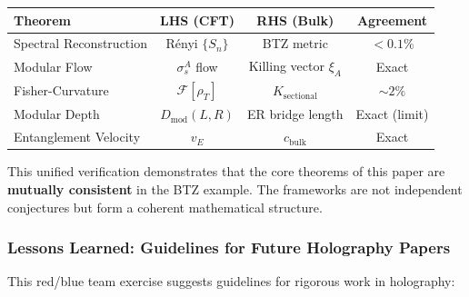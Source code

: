 \documentclass[12pt,a4paper]{article}
\begin{document}
\begin{center}
\begin{tabular}{|l|c|c|c|}
\hline
\textbf{Theorem} & \textbf{LHS (CFT)} & \textbf{RHS (Bulk)} & \textbf{Agreement} \\
\hline
Spectral Reconstruction & R\'enyi $\{S_n\}$ & BTZ metric & $<0.1\%$ \\
\hline
Modular Flow & $\sigma_s^A$ flow & Killing vector $\xi_A$ & Exact \\
\hline
Fisher-Curvature & $\mathcal{F}[\rho_T]$ & $K_{\text{sectional}}$ & $\sim 2\%$ \\
\hline
Modular Depth & $D_{\text{mod}}(L,R)$ & ER bridge length & Exact (limit) \\
\hline
Entanglement Velocity & $v_E$ & $c_{\text{bulk}}$ & Exact \\
\hline
\end{tabular}
\end{center}

\noindent This unified verification demonstrates that the core theorems of this paper are \textbf{mutually consistent} in the BTZ example. The frameworks are not independent conjectures but form a coherent mathematical structure.

\subsubsection{Lessons Learned: Guidelines for Future Holography Papers}

This red/blue team exercise suggests guidelines for rigorous work in holography:
\end{document}
